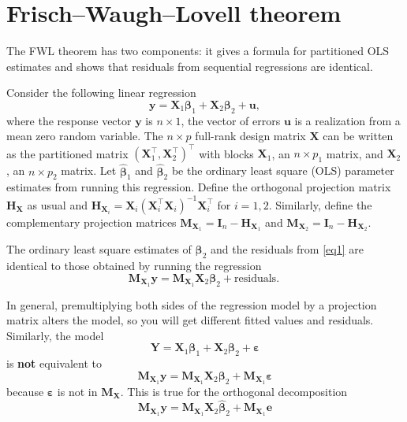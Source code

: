 \documentclass[]{book}
\theoremstyle{definition}
\theoremstyle{definition}
\theoremstyle{definition}
\theoremstyle{remark}
\let\BeginKnitrBlock\begin \let\EndKnitrBlock\end
\begin{document}
\hypertarget{frischwaughlovell-theorem}{%
\chapter{Frisch--Waugh--Lovell
theorem}\label{frischwaughlovell-theorem}}

The FWL theorem has two components: it gives a formula for partitioned
OLS estimates and shows that residuals from sequential regressions are
identical.

Consider the following linear regression \[
 {\boldsymbol{y}}= \mathbf{X}_1\boldsymbol{\beta}_1+\mathbf{X}_2\boldsymbol{\beta}_2+ \boldsymbol{u}, \label{eq1}
\] where the response vector \({\boldsymbol{y}}\) is \(n \times 1\), the
vector of errors \(\boldsymbol{u}\) is a realization from a mean zero
random variable. The \(n \times p\) full-rank design matrix
\(\mathbf{X}\) can be written as the partitioned matrix
\((\mathbf{X}_1^\top, \mathbf{X}_2^\top)^\top\) with blocks
\(\mathbf{X}_1\), an \(n \times p_1\) matrix, and \(\mathbf{X}_2\), an
\(n \times p_2\) matrix. Let \(\hat{\boldsymbol{\beta}}_1\) and
\(\hat{\boldsymbol{\beta}}_2\) be the ordinary least square (OLS)
parameter estimates from running this regression. Define the orthogonal
projection matrix \(\mathbf{H}_\mathbf{X}\) as usual and
\(\mathbf{H}_{\mathbf{X}_i} = \mathbf{X}_i(\mathbf{X}_i^\top\mathbf{X}_i)^{-1}\mathbf{X}_i^\top\)
for \(i=1, 2\). Similarly, define the complementary projection matrices
\(\mathbf{M}_{\mathbf{X}_1}=\mathbf{I}_n-\mathbf{H}_{\mathbf{X}_1}\) and
\(\mathbf{M}_{\mathbf{X}_2}=\mathbf{I}_n-\mathbf{H}_{\mathbf{X}_2}\).

\BeginKnitrBlock{theorem}
\protect\hypertarget{thm:unnamed-chunk-13}{}{\label{thm:unnamed-chunk-13}
}The ordinary least square estimates of \(\boldsymbol{\beta}_2\) and the
residuals from \eqref{eq1} are identical to those obtained by running
the regression \[
 \mathbf{M}_{\mathbf{X}_1}{\boldsymbol{y}}= \mathbf{M}_{\mathbf{X}_1}\mathbf{X}_2\boldsymbol{\beta}_2 + \text{residuals}. \label{eq2} \
\]
\EndKnitrBlock{theorem}

\BeginKnitrBlock{rmdcaution}
In general, premultiplying both sides of the regression model by a
projection matrix alters the model, so you will get different fitted
values and residuals. Similarly, the model
\[\boldsymbol{Y} = \mathbf{X}_1 \boldsymbol{\beta}_1 + \mathbf{X}_2\boldsymbol{\beta}_2 + \boldsymbol{\varepsilon}\]
is \textbf{not} equivalent to \[
\mathbf{M}_{\mathbf{X}_1}\boldsymbol{y} = \mathbf{M}_{\mathbf{X}_1}\mathbf{X}_2 \boldsymbol{\beta}_2 + \mathbf{M}_{\mathbf{X}_1}\boldsymbol{\varepsilon}
\] because \(\boldsymbol{\varepsilon}\) is not in
\(\mathbf{M}_\mathbf{X}\). This is true for the orthogonal decomposition
\[
\mathbf{M}_{\mathbf{X}_1}\boldsymbol{y} = \mathbf{M}_{\mathbf{X}_1}\mathbf{X}_2 \hat{\boldsymbol{\beta}}_2 + \mathbf{M}_{\mathbf{X}_1}\boldsymbol{e}
\]
\EndKnitrBlock{rmdcaution}
\end{document}

